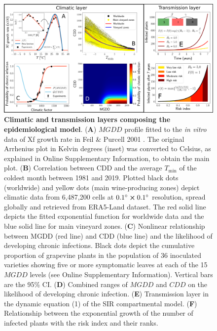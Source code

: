 \begin{figure}[t!]
    \centering
    \includegraphics[width=\textwidth]{Figures/Model_h.pdf}
    \caption{\textbf{Climatic and transmission layers composing the
            epidemiological model}. (\textbf{A}) $MGDD$ profile fitted to the
        \textit{in
            vitro } data of Xf growth rate in Feil \& Purcell 2001
        \cite{Feil2001}. The
        original Arrhenius plot in Kelvin degrees (inset) was converted to
        Celsius, as
        explained in Online Supplementary Information, to obtain the main plot.
        (\textbf{B})
        Correlation between CDD and the average $T_{\textrm{min}}$ of the
        coldest month
        between 1981 and 2019. Plotted black dots (worldwide) and yellow dots
        (main
        wine-producing zones) depict climatic data from 6,487,200 cells at
        $\SI{0.1}{\degree} \cross \SI{0.1}{\degree}$ resolution, spread
        globally and
        retrieved from ERA5-Land dataset. The red solid line depicts the fitted
        exponential function for worldwide data and the blue solid line for
        main
        vineyard zones. (\textbf{C}) Nonlinear relationship between MGDD (red
        line) and
        CDD (blue line) and the likelihood of developing chronic infections.
        Black dots
        depict the cumulative proportion of grapevine plants in the population
        of $36$
        inoculated varieties showing five or more symptomatic leaves at each of
        the 15
        $MGDD$ levels (see Online Supplementary Information). Vertical bars are
        the
        95\% CI.
        (\textbf{D}) Combined ranges of $MGDD$ and $CDD$ on the likelihood of
        developing chronic infection. (\textbf{E}) Transmission layer in the
        dynamic
        equation (1) of the SIR compartmental model. (\textbf{F}) Relationship
        between
        the exponential growth of the number of infected plants with the risk
        index and
        their ranks.}
    \label{fig1}
\end{figure}

